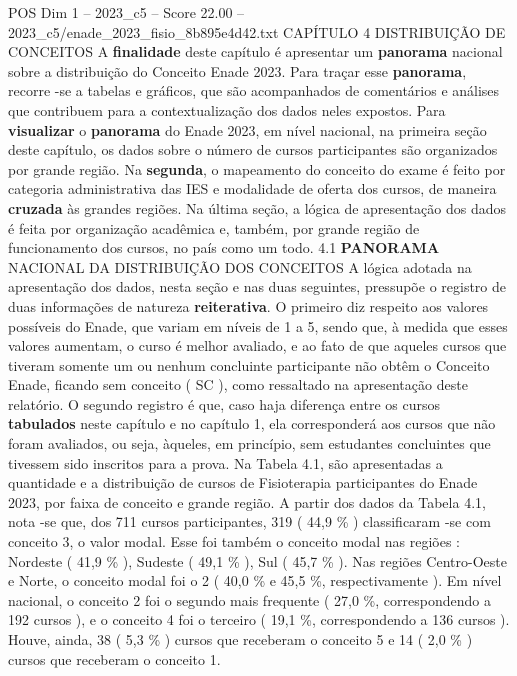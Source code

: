 \begin{textsample}{POS Dim 1 – 2023\_c5 – Score 22.00 – 2023\_c5/enade\_2023\_fisio\_8b895e4d42.txt}  \label{ex:f1_pos_011}
CAPÍTULO 4 DISTRIBUIÇÃO DE CONCEITOS A \textbf{finalidade} deste capítulo é apresentar um \textbf{panorama} nacional sobre a distribuição do Conceito Enade 2023.
Para traçar esse \textbf{panorama}, recorre -se a tabelas e gráficos, que são acompanhados de comentários e análises que contribuem para a contextualização dos dados neles expostos.
Para \textbf{visualizar} o \textbf{panorama} do Enade 2023, em nível nacional, na primeira seção deste capítulo, os dados sobre o número de cursos participantes são organizados por grande região.
Na \textbf{segunda}, o mapeamento do conceito do exame é feito por categoria administrativa das IES e modalidade de oferta dos cursos, de maneira \textbf{cruzada} às grandes regiões.
Na última seção, a lógica de apresentação dos dados é feita por organização acadêmica e, também, por grande região de funcionamento dos cursos, no país como um todo. 4.1 \textbf{PANORAMA} NACIONAL DA DISTRIBUIÇÃO DOS CONCEITOS A lógica adotada na apresentação dos dados, nesta seção e nas duas seguintes, pressupõe o registro de duas informações de natureza \textbf{reiterativa}.
O primeiro diz respeito aos valores possíveis do Enade, que variam em níveis de 1 a 5, sendo que, à medida que esses valores aumentam, o curso é melhor avaliado, e ao fato de que aqueles cursos que tiveram somente um ou nenhum concluinte participante não obtêm o Conceito Enade, ficando sem conceito ( SC ), como ressaltado na apresentação deste relatório.
O segundo registro é que, caso haja diferença entre os cursos \textbf{tabulados} neste capítulo e no capítulo 1, ela corresponderá aos cursos que não foram avaliados, ou seja, àqueles, em princípio, sem estudantes concluintes que tivessem sido inscritos para a prova.
Na Tabela 4.1, são apresentadas a quantidade e a distribuição de cursos de Fisioterapia participantes do Enade 2023, por faixa de conceito e grande região.
A partir dos dados da Tabela 4.1, nota -se que, dos 711 cursos participantes, 319 ( 44,9 \% ) classificaram -se com conceito 3, o valor modal.
Esse foi também o conceito modal nas regiões : Nordeste ( 41,9 \% ), Sudeste ( 49,1 \% ), Sul ( 45,7 \% ).
Nas regiões Centro-Oeste e Norte, o conceito modal foi o 2 ( 40,0 \% e 45,5 \%, respectivamente ).
Em nível nacional, o conceito 2 foi o segundo mais frequente ( 27,0 \%, correspondendo a 192 cursos ), e o conceito 4 foi o terceiro ( 19,1 \%, correspondendo a 136 cursos ).
Houve, ainda, 38 ( 5,3 \% ) cursos que receberam o conceito 5 e 14 ( 2,0 \% ) cursos que receberam o conceito 1.

\end{textsample}

